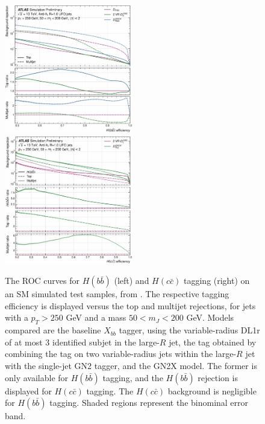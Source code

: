 \begin{center}
  \begin{figure}[h!]
  \centerline{
  \includegraphics[width=0.50\textwidth]{Images/FTAG/GN2X/roc/rocHbb.pdf}
  \includegraphics[width=0.50\textwidth]{Images/FTAG/GN2X/roc/rocHcc.pdf}
  }
  \caption{The ROC curves for $H(b\bar{b})$ (left) and $H(c\bar{c})$ tagging (right) on an SM simulated test samples, from \cite{ATL-PHYS-PUB-2023-021}. The respective tagging efficiency is displayed versus the top and multijet rejections, for jets with a $p_T > 250$ GeV and a mass $50 < m_J < 200$ GeV. Models compared are the baseline $X_{bb}$ tagger, using the variable-radius DL1r of at most 3 identified subjet in the large-$R$ jet, the tag obtained by combining the tag on two variable-radius jets within the large-$R$ jet with the single-jet GN2 tagger, and the GN2X model. The former is only available for $H(b\bar{b})$ tagging, and the $H(b\bar{b})$ rejection is displayed for $H(c\bar{c})$ tagging. The $H(c\bar{c})$ background is negligible for $H(b\bar{b})$ tagging. Shaded regions represent the binominal error band.}
  \label{fig:rocGN2X}
  \end{figure}
\end{center}

